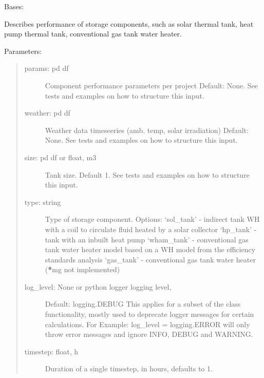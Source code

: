 \documentclass[letterpaper,10pt,english,openany]{sphinxmanual}
\begin{document}
\begin{fulllineitems}
\label{\detokenize{source/mswh.system:mswh.system.components.Storage}}
Bases: 

Describes performance of storage components, such as
solar thermal tank, heat pump thermal tank, conventional gas
tank water heater.

Parameters:
\begin{quote}
\begin{description}
\item[{params: pd df}] \leavevmode
Component performance parameters per project
Default: None. See tests and examples on how to
structure this input.

\item[{weather: pd df}] \leavevmode
Weather data timeseeries (amb. temp, solar irradiation)
Default: None. See tests and examples on how to
structure this input.

\item[{size: pd df or float, m3}] \leavevmode
Tank size.
Default 1. See tests and examples on how to
structure this input.

\item[{type: string}] \leavevmode
Type of storage component. Options:
‘sol\_tank’ - indirect tank WH with a coil to circulate
fluid heated by a solar collector
‘hp\_tank’ - tank with an inbuilt heat pump
‘wham\_tank’ - conventional gas tank water heater model
based on a WH model from the efficiency standards analysis
‘gas\_tank’ - conventional gas tank water heater ({\color{red}\bfseries{}*}mg not
implemented)

\item[{log\_level: None or python logger logging level,}] \leavevmode
Default: logging.DEBUG
This applies for a subset of the class functionality, mostly
used to deprecate logger messages for certain calculations.
For Example: log\_level = logging.ERROR will only throw error
messages and ignore INFO, DEBUG and WARNING.

\item[{timestep: float, h}] \leavevmode
Duration of a single timestep, in hours, defaults to 1.

\end{description}
\end{quote}


\end{fulllineitems}
\end{document}
